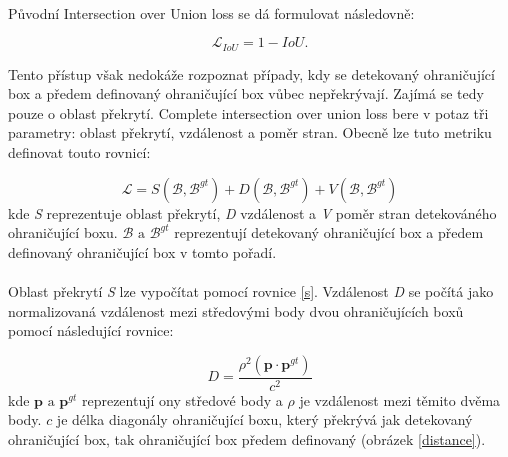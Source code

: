 \paragraph{} Původní Intersection over Union loss se dá formulovat následovně: 

\begin{equation}\label{s}
\mathcal{L}_{I o U}=1-I o U .
\end{equation}

Tento přístup však nedokáže rozpoznat případy, kdy se detekovaný ohraničující box a předem definovaný ohraničující box vůbec nepřekrývají. Zajímá se tedy pouze o oblast překrytí. Complete intersection over union loss \cite{ciou} bere v potaz tři parametry: oblast překrytí, vzdálenost a poměr stran. Obecně lze tuto metriku definovat touto rovnicí:

\begin{equation}
\mathcal{L}=S\left(\mathcal{B}, \mathcal{B}^{g t}\right)+D\left(\mathcal{B}, \mathcal{B}^{g t}\right)+V\left(\mathcal{B}, \mathcal{B}^{g t}\right)
\end{equation}
kde \textit{S} reprezentuje oblast překrytí, \textit{D} vzdálenost a \textit{V} poměr stran detekováného ohraničující boxu. \begin{math}\mathcal{B} \text{ a } \mathcal{B}^{g t}\end{math} reprezentují detekovaný ohraničující box a předem definovaný ohraničující box v tomto pořadí. 
\paragraph{} Oblast překrytí \textit{S} lze vypočítat pomocí rovnice \ref{s}. Vzdálenost \textit{D} se počítá jako normalizovaná vzdálenost mezi středovými body dvou ohraničujících boxů pomocí následující rovnice:

\begin{equation}
D=\frac{\rho^2\left(\boldsymbol{p} \cdot \boldsymbol{p}^{g t}\right)}{c^2}
\end{equation}
kde \begin{math}\boldsymbol{p} \text{ a } \boldsymbol{p}^{g t} \end{math} reprezentují ony středové body a \begin{math}\rho\end{math} je vzdálenost mezi těmito dvěma body. \begin{math}c\end{math} je délka diagonály ohraničující boxu, který překrývá jak detekovaný ohraničující box, tak ohraničující box předem definovaný (obrázek \ref{distance}). 

